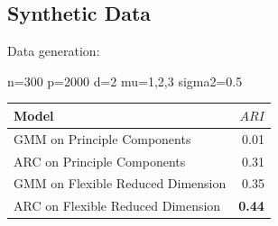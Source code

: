 \documentclass[12pt]{article}
\begin{document}
\subsection{Synthetic Data}
Data generation:

n=300
p=2000
d=2
mu=1,2,3
sigma2=0.5


\begin{table}[H]
\centering
	\begin{tabular}{| l | r |}
	\hline
			Model & $ARI$ \\
	\hline
			GMM on Principle Components &  0.01  \\
			ARC on Principle Components		& 0.31 \\
			GMM on Flexible Reduced Dimension &  0.35  \\
			ARC on Flexible Reduced Dimension		& {\bf 0.44} \\
			\hline
	\end{tabular}
\end{table}
\end{document}
